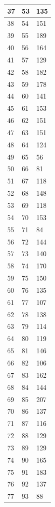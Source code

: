 \begin{tabular}{p{}p{}p{}}
\hline
37 & 53 & 135 \\
\hline
38 & 54 & 151 \\
\hline
39 & 55 & 189 \\
\hline
40 & 56 & 164 \\
\hline
41 & 57 & 129 \\
\hline
42 & 58 & 182 \\
\hline
43 & 59 & 178 \\
\hline
44 & 60 & 141 \\
\hline
45 & 61 & 153 \\
\hline
46 & 62 & 151 \\
\hline
47 & 63 & 151 \\
\hline
48 & 64 & 124 \\
\hline
49 & 65 & 56 \\
\hline
50 & 66 & 81 \\
\hline
51 & 67 & 118 \\
\hline
52 & 68 & 148 \\
\hline
53 & 69 & 118 \\
\hline
54 & 70 & 153 \\
\hline
55 & 71 & 84 \\
\hline
56 & 72 & 144 \\
\hline
57 & 73 & 140 \\
\hline
58 & 74 & 170 \\
\hline
59 & 75 & 150 \\
\hline
60 & 76 & 135 \\
\hline
61 & 77 & 107 \\
\hline
62 & 78 & 138 \\
\hline
63 & 79 & 114 \\
\hline
64 & 80 & 119 \\
\hline
65 & 81 & 146 \\
\hline
66 & 82 & 106 \\
\hline
67 & 83 & 162 \\
\hline
68 & 84 & 144 \\
\hline
69 & 85 & 207 \\
\hline
70 & 86 & 137 \\
\hline
71 & 87 & 116 \\
\hline
72 & 88 & 129 \\
\hline
73 & 89 & 129 \\
\hline
74 & 90 & 165 \\
\hline
75 & 91 & 183 \\
\hline
76 & 92 & 137 \\
\hline
77 & 93 & 88 \\

\end{tabular}
